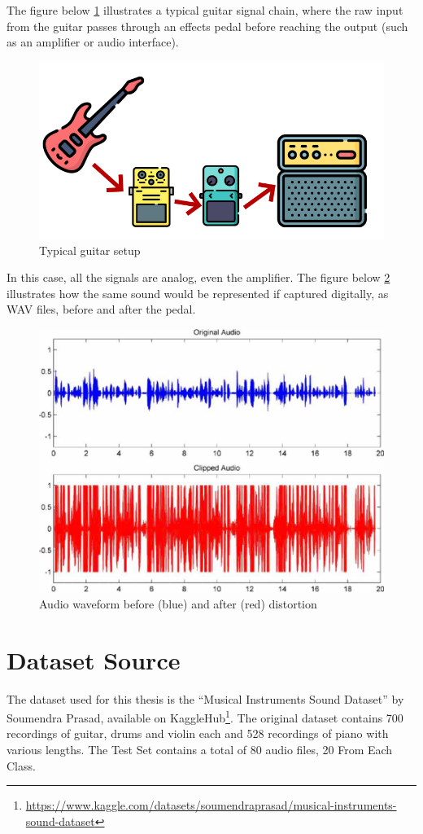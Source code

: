 \documentclass[masterthesis]{fer}
\begin{document}
The figure below \ref{fig:effects-order} illustrates a typical guitar signal chain, where the raw input from the guitar passes through an effects pedal before reaching the output (such as an amplifier or audio interface). 

\begin{figure}[htb]
  \centering
  \includegraphics[width=0.6\linewidth]{Figures/audio-chain.png} 
  \caption{Typical guitar setup}
  \label{fig:effects-order}
\end{figure}

In this case, all the signals are analog, even the amplifier. The figure below \ref{fig:effects-order-2} illustrates how the same sound would be represented if captured digitally, as WAV files, before and after the pedal.

\begin{figure}[htb]
  \centering
  \includegraphics[width=0.5\linewidth]{Figures/effects-order-2.jpeg} 
  \caption{Audio waveform before (blue) and after (red) distortion}
  \label{fig:effects-order-2}
\end{figure}



\section{Dataset Source}
\label{sec:dataset-source}

The dataset used for this thesis is the ``Musical Instruments Sound Dataset'' by Soumendra Prasad, available on KaggleHub\footnote{\url{https://www.kaggle.com/datasets/soumendraprasad/musical-instruments-sound-dataset}}. The original dataset contains 700 recordings of guitar, drums and violin each and 528 recordings of piano with various lengths. The Test Set contains a total of 80 audio files, 20 From Each Class.
\end{document}
